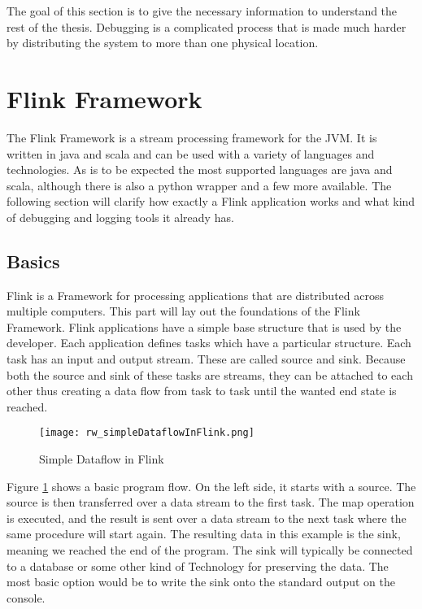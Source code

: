 The goal of this section is to give the necessary information to understand the rest of the thesis. Debugging is a complicated process that is made much harder by distributing the system to more than one physical location.

\section{Flink Framework}
\label{flinkFramework}
The Flink Framework is a stream processing framework for the JVM. It is written in java and scala and can be used with a variety of languages and technologies. As is to be expected the most supported languages are java and scala, although there is also a python wrapper and a few more available. The following section will clarify how exactly a Flink application works and what kind of debugging and logging tools it already has.

\subsection{Basics}
Flink is a Framework for processing applications that are distributed across multiple computers. This part will lay out the foundations of the Flink Framework.
Flink applications have a simple base structure that is used by the developer. Each application defines tasks which have a particular structure. Each task has an input and output stream. These are called source and sink. Because both the source and sink of these tasks are streams, they can be attached to each other thus creating a data flow from task to task until the wanted end state is reached.

\begin{figure}[h!]
    \centering
      \texttt{[image: rw\_simpleDataflowInFlink.png]}
      \caption{Simple Dataflow in Flink}
      \label{simpleDataflowInFlink}
\end{figure}

Figure \ref{simpleDataflowInFlink} shows a basic program flow. On the left side, it starts with a source. The source is then transferred over a data stream to the first task. The map operation is executed, and the result is sent over a data stream to the next task where the same procedure will start again. The resulting data in this example is the sink, meaning we reached the end of the program. The sink will typically be connected to a database or some other kind of Technology for preserving the data. The most basic option would be to write the sink onto the standard output on the console.

